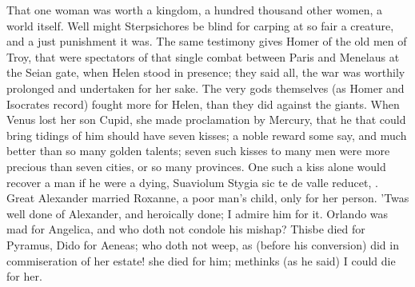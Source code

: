 That one woman was worth a kingdom, a hundred thousand other women, a
world itself. Well might Sterpsichores be blind for carping at so
fair a creature, and a just punishment it was. The same testimony gives
Homer of the old men of Troy, that were spectators of that single
combat between Paris and Menelaus at the Seian gate, when Helen stood
in presence; they said all, the war was worthily prolonged and
undertaken for her sake. The very gods themselves (as Homer and
Isocrates record) fought more for Helen, than they did against
the giants. When Venus lost her son Cupid, she made proclamation
by Mercury, that he that could bring tidings of him should have seven
kisses; a noble reward some say, and much better than so many golden
talents; seven such kisses to many men were more precious than seven
cities, or so many provinces. One such a kiss alone would recover a man
if he were a dying, Suaviolum Stygia sic te de valle reducet, \etc{}.
Great Alexander married Roxanne, a poor man's child, only for her
person. 'Twas well done of Alexander, and heroically done; I
admire him for it. Orlando was mad for Angelica, and who doth not
condole his mishap? Thisbe died for Pyramus, Dido for Aeneas; who doth
not weep, as (before his conversion) \Austin{} did in commiseration
of her estate! she died for him; methinks (as he said) I could die for
her.

